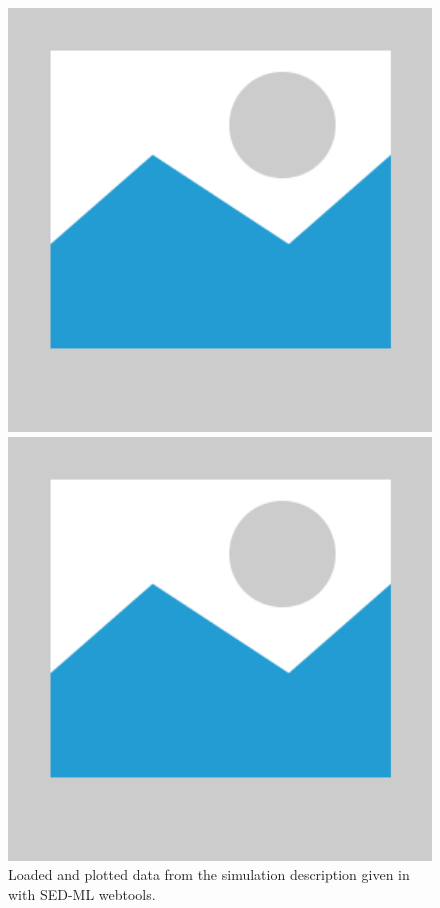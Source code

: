 \begin{figure}[ht]
    \centering
    \begin{minipage}{0.47\textwidth}
        \centering
        \includegraphics[width=1.0\textwidth]{examples/placeholder}
        \caption{Loaded and plotted data from the simulation description given in  with SED-ML webtools.}
    \end{minipage}\hfill
    \begin{minipage}{0.47\textwidth}
        \centering
        \includegraphics[width=1.0\textwidth]{examples/placeholder}

\end{minipage}
\end{figure}
